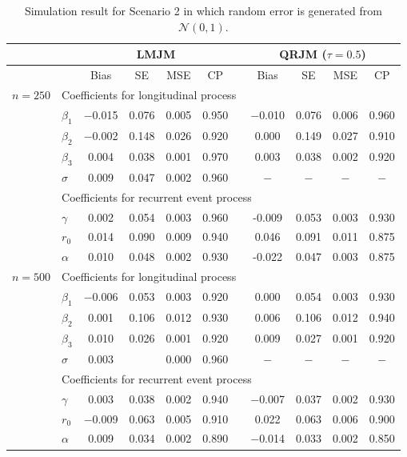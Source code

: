 \begin{table}[H]
\centering
\caption{Simulation result for Scenario 2 in which random error is generated from $\mathcal{N}(0, 1)$.}
\label{tab:p2simsce4}
\begin{tabular}{clccccccccc}
\hline
& & \multicolumn{4}{c}{LMJM} & & \multicolumn{4}{c}{QRJM ($\tau=0.5$)}\\
\hline
 & & Bias & SE & MSE & CP && Bias & SE & MSE & CP \\
 \hline
\multirow{9}{*}{$n=250$} &  \multicolumn{8}{l}{Coefficients for longitudinal process}\\
  & $\beta_1$ & $-$0.015 & 0.076 & 0.005 & 0.950 && $-$0.010 & 0.076 & 0.006 & 0.960 \\
  &   $\beta_2$ & $-$0.002 & 0.148 & 0.026 & 0.920 && 0.000 & 0.149 & 0.027 & 0.910 \\
  &   $\beta_3$ & 0.004 & 0.038 & 0.001 & 0.970 && 0.003 & 0.038 & 0.002 & 0.920 \\
  &   $\sigma$ & 0.009 & 0.047 & 0.002 & 0.960 &&  $-$ & $-$ & $-$ & $-$ \\
&  \multicolumn{8}{l}{Coefficients for recurrent event process}\\
  &   $\gamma$ & 0.002 & 0.054 & 0.003 & 0.960 && -0.009 & 0.053 & 0.003 & 0.930 \\
  &   $r_0$ & 0.014 & 0.090 & 0.009 & 0.940 && 0.046 & 0.091 & 0.011 & 0.875 \\
  &   $\alpha$ & 0.010 & 0.048& 0.002 & 0.930&& -0.022 & 0.047 & 0.003 & 0.875 \\
   \hline\hline
  \multirow{9}{*}{$n=500$} & \multicolumn{8}{l}{Coefficients for longitudinal process}\\
  & $\beta_1$ &  $-$0.006 & 0.053 & 0.003 & 0.920 && 0.000 & 0.054 & 0.003 & 0.930 \\
  & $\beta_2$ & 0.001 & 0.106 & 0.012 & 0.930 && 0.006 & 0.106 & 0.012 & 0.940 \\
  & $\beta_3$ & 0.010 & 0.026 & 0.001 & 0.920 && 0.009 & 0.027 & 0.001 & 0.920 \\
  & $\sigma$ & 0.003 & & 0.000 & 0.960 &&  $-$ & $-$ & $-$ & $-$ \\
  &  \multicolumn{8}{l}{Coefficients for recurrent event process}\\
  & $\gamma$ & 0.003 & 0.038 & 0.002 & 0.940 && $-$0.007 & 0.037 & 0.002 & 0.930 \\
  & $r_0$ & $-$0.009 & 0.063 & 0.005 & 0.910 && 0.022 & 0.063 & 0.006 & 0.900 \\
  & $\alpha$ & 0.009 & 0.034 & 0.002 & 0.890 && $-$0.014 & 0.033 & 0.002 & 0.850 \\
   \hline
\end{tabular}
\end{table}




%
%
%
%
% 

% 